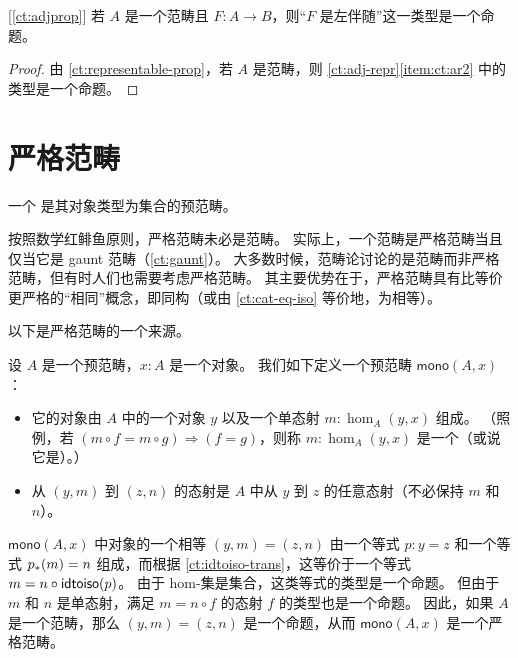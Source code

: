 \begin{cor}\label{ct:adjprop2}[\cref{ct:adjprop}]
  若 $A$ 是一个范畴且 $F:A\to B$，则``$F$ 是左伴随''这一类型是一个命题。
\end{cor}

\begin{proof}
  由 \cref{ct:representable-prop}，若 $A$ 是范畴，则 \cref{ct:adj-repr}\ref{item:ct:ar2} 中的类型是一个命题。
\end{proof}



\section{严格范畴}
\label{sec:strict-categories}

%

\begin{defn}\label{ct:strict-category}
  一个
  是其对象类型为集合的预范畴。
\end{defn}

按照数学红鲱鱼原则，严格范畴未必是范畴。
实际上，一个范畴是严格范畴当且仅当它是 gaunt 范畴（\cref{ct:gaunt}）。
%
%
大多数时候，范畴论讨论的是范畴而非严格范畴，但有时人们也需要考虑严格范畴。
其主要优势在于，严格范畴具有比等价更严格的``相同''概念，即同构（或由 \cref{ct:cat-eq-iso} 等价地，为相等）。

以下是严格范畴的一个来源。

\begin{eg}\label{ct:mono-cat}
  设 $A$ 是一个预范畴，$x:A$ 是一个对象。
  我们如下定义一个预范畴 $\mathsf{mono}(A,x)$：
  \begin{itemize}
  \item 它的对象由 $A$ 中的一个对象 $y$ 以及一个单态射 $m:\hom_A(y,x)$ 组成。
    （照例，若 $(m\circ f = m\circ g) \Rightarrow (f=g)$，则称 $m:\hom_A(y,x)$ 是一个（或说它是）。）
  \item 从 $(y,m)$ 到 $(z,n)$ 的态射是 $A$ 中从 $y$ 到 $z$ 的任意态射（不必保持 $m$ 和 $n$）。
  \end{itemize}
  $\mathsf{mono}(A,x)$ 中对象的一个相等 $(y,m)=(z,n)$ 由一个等式 $p:y=z$ 和一个等式 ${p}_{*}\mathopen{}\left({m}\right)\mathclose{}=n$ 组成，而根据 \cref{ct:idtoiso-trans}，这等价于一个等式 $m=n\circ \mathsf{idtoiso}(p)$。
  由于 hom-集是集合，这类等式的类型是一个命题。
  但由于 $m$ 和 $n$ 是单态射，满足 $m = n\circ f$ 的态射 $f$ 的类型也是一个命题。
  因此，如果 $A$ 是一个范畴，那么 $(y,m)=(z,n)$ 是一个命题，从而 $\mathsf{mono}(A,x)$ 是一个严格范畴。
\end{eg}

